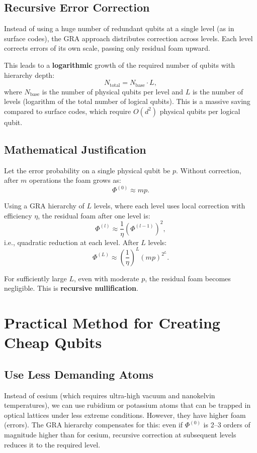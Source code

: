 \documentclass[12pt,a4paper]{article}
\begin{document}
\subsection{Recursive Error Correction}

Instead of using a huge number of redundant qubits at a single level (as in surface codes), the GRA approach distributes correction across levels. Each level corrects errors of its own scale, passing only residual foam upward.

This leads to a \textbf{logarithmic} growth of the required number of qubits with hierarchy depth:
\[
N_{\text{total}} = N_{\text{base}} \cdot L,
\]
where \(N_{\text{base}}\) is the number of physical qubits per level and \(L\) is the number of levels (logarithm of the total number of logical qubits). This is a massive saving compared to surface codes, which require \(O(d^2)\) physical qubits per logical qubit.

\subsection{Mathematical Justification}

Let the error probability on a single physical qubit be \(p\). Without correction, after \(m\) operations the foam grows as:
\[
\Phi^{(0)} \approx m p.
\]

Using a GRA hierarchy of \(L\) levels, where each level uses local correction with efficiency \(\eta\), the residual foam after one level is:
\[
\Phi^{(l)} \approx \frac{1}{\eta} \left( \Phi^{(l-1)} \right)^2,
\]
i.e., quadratic reduction at each level. After \(L\) levels:
\[
\Phi^{(L)} \approx \left( \frac{1}{\eta} \right)^{L} (m p)^{2^L}.
\]

For sufficiently large \(L\), even with moderate \(p\), the residual foam becomes negligible. This is \textbf{recursive nullification}.

\section{Practical Method for Creating Cheap Qubits}

\subsection{Use Less Demanding Atoms}

Instead of cesium (which requires ultra-high vacuum and nanokelvin temperatures), we can use rubidium or potassium atoms that can be trapped in optical lattices under less extreme conditions. However, they have higher foam (errors). The GRA hierarchy compensates for this: even if \(\Phi^{(0)}\) is 2–3 orders of magnitude higher than for cesium, recursive correction at subsequent levels reduces it to the required level.
\end{document}
